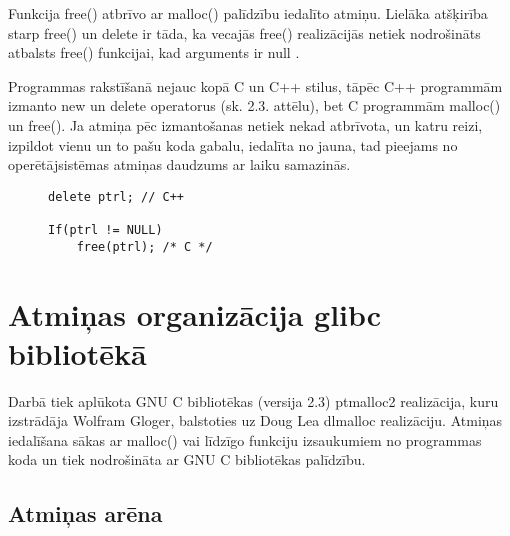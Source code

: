 Funkcija free() atbrīvo ar malloc() palīdzību iedalīto atmiņu.
Lielāka atšķirība starp free() un delete ir tāda, ka vecajās free() realizācijās netiek nodrošināts atbalsts free() funkcijai, kad arguments ir null \cite{POCF}. 

Programmas rakstīšanā nejauc kopā C un C++ stilus, tāpēc C++ programmām izmanto 
new un delete operatorus (sk. 2.3. attēlu), bet C programmām malloc() un free().
Ja atmiņa pēc izmantošanas netiek nekad atbrīvota, un katru reizi, izpildot vienu un to pašu koda gabalu, iedalīta no jauna, tad pieejams no operētājsistēmas atmiņas daudzums ar laiku samazinās.

\begin{figure}[h]
\begin{lstlisting}
delete ptrl; // C++

If(ptrl != NULL)
	free(ptrl); /* C */
\end{lstlisting}
\caption{\textbf{\fontsize{11}{12}\selectfont {Dinamiskās atmiņas atbrīvošana C un C++}}}
\end{figure}




\section{Atmiņas organizācija glibc bibliotēkā}
Darbā tiek aplūkota GNU C bibliotēkas (versija 2.3) ptmalloc2 realizācija, kuru izstrādāja Wolfram Gloger, balstoties uz Doug Lea dlmalloc realizāciju. 
Atmiņas iedalīšana sākas ar malloc() vai līdzīgo funkciju izsaukumiem no programmas koda un tiek nodrošināta ar GNU C bibliotēkas palīdzību. 


\subsection{Atmiņas arēna}

